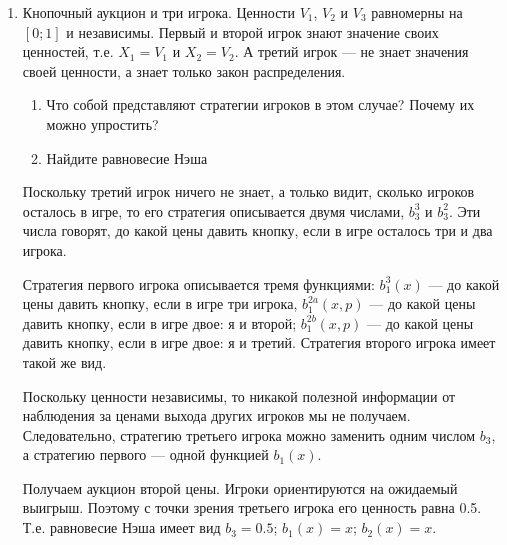\begin{enumerate}



\item Кнопочный аукцион и три игрока. Ценности $ V_{1} $, $ V_{2} $ и $ V_{3} $ равномерны на $ [0;1] $ и независимы. Первый и второй игрок знают значение своих ценностей, т.е. $ X_{1}=V_{1} $ и $ X_{2}=V_{2} $. А третий игрок --- не знает значения своей ценности, а знает только закон распределения.
\begin{enumerate}
\item Что собой представляют стратегии игроков в этом случае? Почему их можно упростить?
\item Найдите равновесие Нэша
\end{enumerate}


Поскольку третий игрок ничего не знает, а только видит, сколько игроков осталось в игре, то его стратегия описывается двумя числами, $ b_{3}^{3} $ и $ b_{3}^{2} $. Эти числа говорят, до какой цены давить кнопку, если в игре осталось три и два игрока.

Стратегия первого игрока описывается тремя функциями: $ b_{1}^{3}(x) $ --- до какой цены давить кнопку, если в игре три игрока, $b_{1}^{2a}(x,p)$ --- до какой цены давить кнопку, если в игре двое: я и второй; $b_{1}^{2b}(x,p)$ --- до какой цены давить кнопку, если в игре двое: я и третий. Стратегия второго игрока имеет такой же вид. 

Поскольку ценности независимы, то никакой полезной информации от наблюдения за ценами выхода других игроков мы не получаем. Следовательно, стратегию третьего игрока можно заменить одним числом $ b_{3} $, а стратегию первого --- одной функцией $b_{1}(x)$.

Получаем аукцион второй цены. Игроки ориентируются на ожидаемый выигрыш. Поэтому с точки зрения третьего игрока его ценность равна 0.5. Т.е. равновесие Нэша имеет вид $ b_{3}=0.5 $; $ b_{1}(x)=x $; $ b_{2}(x)=x $.


\end{enumerate}

